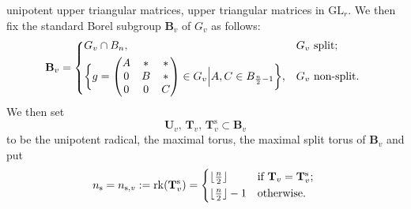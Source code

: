 \documentclass[12pt,oneside,reqno]{amsart}
\theoremstyle{plain}
\begin{document}
	unipotent upper
	triangular matrices,
	upper triangular matrices
	in
	$\mathrm{GL}_r$.
	We then fix the standard Borel subgroup
	$\mathbf{B}_v$ of $G_v$
	as follows:
	\[
	\mathbf{B}_v
	=
	\begin{cases*}
		G_v\cap B_n,
		&
		$G_v$ split;
		\\
		\bigg\{
		g=
		\begin{pmatrix}
			A & \ast & \ast \\
			0 & B & \ast \\
			0 & 0 & C
		\end{pmatrix}
		\in
		G_v
		\Big|
		A,C\in
		B_{\frac{n}{2}-1}
		\bigg\},
		&
		$G_v$ non-split.
	\end{cases*}
	\]
	We then set
	\[
	\mathbf{U}_v,\,
	\mathbf{T}_v,\,
	\mathbf{T}_v^\mathrm{s}
	\subset
	\mathbf{B}_v
	\]
	to be the unipotent radical,
	the maximal torus,
	the maximal split torus of
	$\mathbf{B}_v$
	and put
	\begin{equation}\label{n_s}
		n_\mathrm{s}=n_{\mathrm{s},v}
		:=
		\mathrm{rk}(\mathbf{T}^\mathrm{s}_v)
		=
		\begin{cases*}
			\lfloor\frac{n}{2}\rfloor
			&
			if $\mathbf{T}_v=\mathbf{T}^\mathrm{s}_v$;
			\\
			\lfloor\frac{n}{2}\rfloor-1
			&
			otherwise.
		\end{cases*}
		\index{n@$n_{\mathrm{s}}=n_{\mathrm{s},v}$}
	\end{equation}
	
	
	
	
	
	
	
	
	
	
	
	
	
\end{document}
